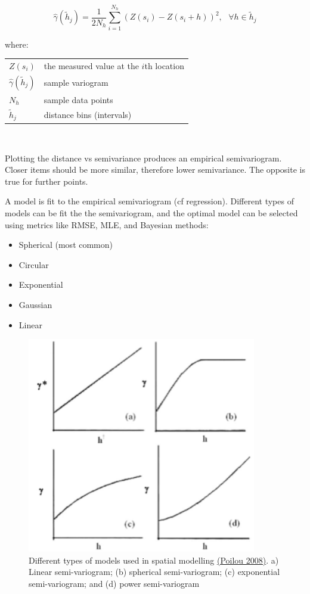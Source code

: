 \documentclass{article}
\makeatletter
\newenvironment{conditions}[1][where:] 
  {#1 \begin{tabular}[t]{>{$}l<{$} @{${}={}$} l}}
  {\end{tabular}\\[\belowdisplayskip]}
\makeatother
\begin{document}
\[\hat{\gamma} (\tilde{h}_j) = \frac{1}{2N_h}\sum_{i=1}^{N_h}\left(Z(s_i) - Z(s_i + h)\right)^2, \text{ } \forall h \in \tilde{h}_j\]

\begin{conditions}
    Z(s_{i}) & the measured value at the $i$th location \\
    \hat{\gamma} (\tilde{h}_j) & sample variogram \\
    N_h & sample data points \\
    \tilde{h}_j & distance bins (intervals)
\end{conditions}

Plotting the distance vs semivariance produces an empirical semivariogram.
Closer items should be more similar, therefore lower semivariance.
The opposite is true for further points.

A model is fit to the empirical semivariogram (cf regression).
Different types of models can be fit the the semivariogram, and the optimal model can be selected using metrics like RMSE, MLE, and Bayesian methods:

\begin{itemize}
    \item Spherical (most common)
    \item Circular
    \item Exponential
    \item Gaussian
    \item Linear
\end{itemize}

\begin{figure}[h]
    \centering
    \label{Kriging variogram model shapes}
    \caption{Different types of models used in spatial modelling \href{https://www.publichealth.columbia.edu/research/population-health-methods/kriging-interpolation}{(Poilou 2008)}. a) Linear semi-variogram; (b) spherical semi-variogram; (c) exponential semi-variogram; and (d) power semi-variogram}
    \includegraphics[width=10cm]{semivariogram-models.png}
\end{figure} 
\end{document}
